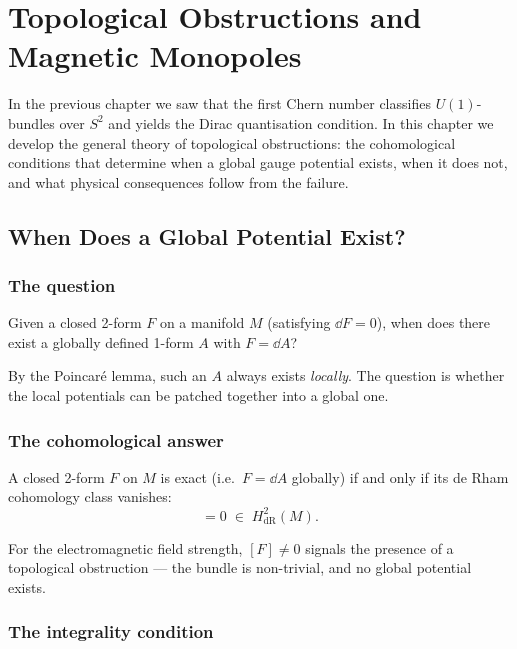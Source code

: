 \chapter{Topological Obstructions and Magnetic Monopoles}

In the previous chapter we saw that the first Chern number classifies $U(1)$-bundles over $S^2$ and yields the Dirac quantisation condition. In this chapter we develop the general theory of topological obstructions: the cohomological conditions that determine when a global gauge potential exists, when it does not, and what physical consequences follow from the failure.

\section{When Does a Global Potential Exist?}

\subsection{The question}

Given a closed 2-form $F$ on a manifold $M$ (satisfying $\dd F = 0$), when does there exist a globally defined 1-form $A$ with $F = \dd A$?

By the Poincar\'e lemma, such an $A$ always exists \emph{locally}. The question is whether the local potentials can be patched together into a global one.

\subsection{The cohomological answer}

\begin{theorem}
A closed 2-form $F$ on $M$ is exact (i.e.\ $F = \dd A$ globally) if and only if its de Rham cohomology class vanishes:
\begin{equation}
[F] = 0 \;\in\; H^2_{\text{dR}}(M).
\end{equation}
\end{theorem}

For the electromagnetic field strength, $[F] \neq 0$ signals the presence of a topological obstruction --- the bundle is non-trivial, and no global potential exists.

\subsection{The integrality condition}


